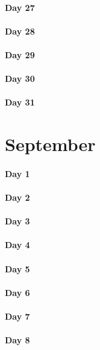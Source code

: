 \documentclass[UTF8,a4paper,8pt]{ctexart}
\begin{document}
 	 \paragraph{Day 27      \quad     }
 	 \paragraph{Day 28      \quad     }
 	 \paragraph{Day 29      \quad     }   
 	 \paragraph{Day 30      \quad     }
 	 \paragraph{Day 31      \quad     }
\section{September}
 	 \paragraph{Day 1       \quad     }
 	 \paragraph{Day 2       \quad     }
 	 \paragraph{Day 3       \quad     }
 	 \paragraph{Day 4       \quad     }
 	 \paragraph{Day 5       \quad     }
 	 \paragraph{Day 6       \quad     }
 	 \paragraph{Day 7       \quad     }
 	 \paragraph{Day 8       \quad     }
\end{document}
